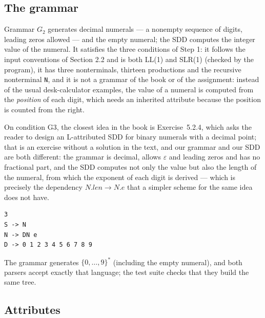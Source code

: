\documentclass[11pt,letterpaper]{article}
\newcommand{\nt}[1]{\texttt{#1}}
\begin{document}
\subsection{The grammar}

Grammar $G_2$ generates decimal numerals --- a nonempty sequence of digits, leading zeros allowed
--- and the empty numeral; the SDD computes the integer value of the numeral. It satisfies the three
conditions of Step 1: it follows the input conventions of Section 2.2 and is both LL(1) and SLR(1)
(checked by the program), it has three nonterminals, thirteen productions and the recursive
nonterminal \nt{N}, and it is not a grammar of the book or of the assignment: instead of the usual
desk-calculator examples, the value of a numeral is computed from the \emph{position} of each digit,
which needs an inherited attribute because the position is counted from the right.

On condition G3, the closest idea in the book is Exercise~5.2.4, which asks the reader to design an
L-attributed SDD for binary numerals with a decimal point; that is an exercise without a solution in
the text, and our grammar and our SDD are both different: the grammar is decimal, allows
$\varepsilon$ and leading zeros and has no fractional part, and the SDD computes not only the value
but also the length of the numeral, from which the exponent of each digit is derived --- which is
precisely the dependency $N.len \to N.e$ that a simpler scheme for the same idea does not have.

\begin{lstlisting}[style=codigo]
3
S -> N
N -> DN e
D -> 0 1 2 3 4 5 6 7 8 9
\end{lstlisting}

The grammar generates $\{0,\dots,9\}^{*}$ (including the empty numeral), and both parsers accept
exactly that language; the test suite checks that they build the same tree.

\subsection{Attributes}
\end{document}
